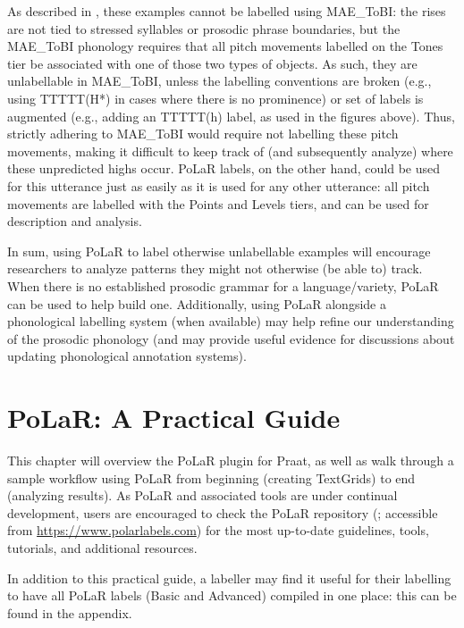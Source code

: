 \documentclass[11pt, twoside]{memoir}
\begin{document}
As described in \citealt{ahnzhou19}, these examples cannot be labelled using MAE\_ToBI: the rises are not tied to stressed syllables or prosodic phrase boundaries, but the MAE\_ToBI phonology requires that all pitch movements labelled on the Tones tier be associated with one of those two types of objects. As such, they are unlabellable in MAE\_ToBI, unless the labelling conventions are broken (e.g., using TTTTT(H*) in cases where there is no prominence) or set of labels is augmented (e.g., adding an TTTTT(h) label, as used in the figures above). Thus, strictly adhering to MAE\_ToBI would require not labelling these pitch movements, making it difficult to keep track of (and subsequently analyze) where these unpredicted highs occur. PoLaR labels, on the other hand, could be used for this utterance just as easily as it is used for any other utterance: all pitch movements are labelled with the Points and Levels tiers, and can be used for description and analysis.

In sum, using PoLaR to label otherwise unlabellable examples will encourage researchers to analyze patterns they might not otherwise (be able to) track. When there is no established prosodic grammar for a language\slash variety, PoLaR can be used to help build one. Additionally, using PoLaR alongside a phonological labelling system (when available) may help refine our understanding of the prosodic phonology (and may provide useful evidence for discussions about updating phonological annotation systems).







\chapter{PoLaR: A Practical Guide}\label{ch:practical}

This chapter will overview the PoLaR plugin for Praat, as well as walk through a sample workflow using PoLaR from beginning (creating TextGrids) to end (analyzing results). As PoLaR and associated tools are under continual development, users are encouraged to check the PoLaR repository (\citealt{ahn-21}; accessible from \href{https://www.polarlabels.com}{https://www.polarlabels.com}) for the most up-to-date guidelines, tools, tutorials, and additional resources.

In addition to this practical guide, a labeller may find it useful for their labelling to have all PoLaR labels (Basic and Advanced) compiled in one place: this can be found in the appendix.
\end{document}
